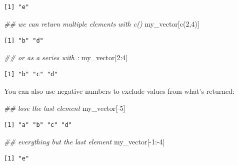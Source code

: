 \documentclass[
  letterpaper,
  DIV=11,
  numbers=noendperiod]{scrreprt}
\newenvironment{Shaded}{\begin{snugshade}}{\end{snugshade}}
\newcommand{\DecValTok}[1]{\textcolor[rgb]{0.68,0.00,0.00}{#1}}
\newcommand{\DocumentationTok}[1]{\textcolor[rgb]{0.37,0.37,0.37}{\textit{#1}}}
\newcommand{\FunctionTok}[1]{\textcolor[rgb]{0.28,0.35,0.67}{#1}}
\newcommand{\NormalTok}[1]{\textcolor[rgb]{0.00,0.23,0.31}{#1}}
\newcommand{\SpecialCharTok}[1]{\textcolor[rgb]{0.37,0.37,0.37}{#1}}
\begin{document}
\begin{verbatim}
[1] "e"
\end{verbatim}

\begin{Shaded}
\begin{Highlighting}[]
\DocumentationTok{\#\# we can return multiple elements with c()}
\NormalTok{my\_vector[}\FunctionTok{c}\NormalTok{(}\DecValTok{2}\NormalTok{,}\DecValTok{4}\NormalTok{)]}
\end{Highlighting}
\end{Shaded}

\begin{verbatim}
[1] "b" "d"
\end{verbatim}

\begin{Shaded}
\begin{Highlighting}[]
\DocumentationTok{\#\# or as a series with :}
\NormalTok{my\_vector[}\DecValTok{2}\SpecialCharTok{:}\DecValTok{4}\NormalTok{]}
\end{Highlighting}
\end{Shaded}

\begin{verbatim}
[1] "b" "c" "d"
\end{verbatim}

You can also use negative numbers to exclude values from what's
returned:

\begin{Shaded}
\begin{Highlighting}[]
\DocumentationTok{\#\# lose the last element}
\NormalTok{my\_vector[}\SpecialCharTok{{-}}\DecValTok{5}\NormalTok{]}
\end{Highlighting}
\end{Shaded}

\begin{verbatim}
[1] "a" "b" "c" "d"
\end{verbatim}

\begin{Shaded}
\begin{Highlighting}[]
\DocumentationTok{\#\# everything but the last element}
\NormalTok{my\_vector[}\SpecialCharTok{{-}}\DecValTok{1}\SpecialCharTok{:{-}}\DecValTok{4}\NormalTok{]}
\end{Highlighting}
\end{Shaded}

\begin{verbatim}
[1] "e"
\end{verbatim}
\end{document}
